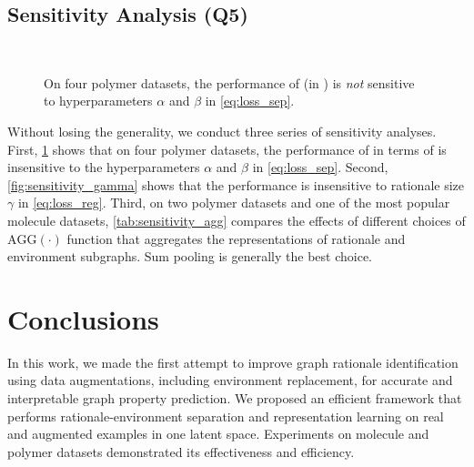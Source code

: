 \documentclass[sigconf]{acmart}
\begin{document}
\subsection{Sensitivity Analysis (Q5)}\label{sec:q5_sensitivity}
\begin{figure}[t]
    \centering
    \vspace{-0.15in}
    \hfill
    \\ \vspace{-0.15in}
    \hfill
    \vspace{-0.15in}
    \caption{On four polymer datasets, the performance of \method (in \regreRSquare) is \emph{not} sensitive to hyperparameters $\alpha$ and $\beta$ in \cref{eq:loss_sep}.}
    \label{fig:loss_sensitivity}
    \vspace{-0.2in}
\end{figure}

Without losing the generality, we conduct three series of sensitivity analyses. First, \cref{fig:loss_sensitivity} shows that on four polymer datasets, the performance of \method in terms of \regreRSquare is insensitive to the hyperparameters $\alpha$ and $\beta$ in \cref{eq:loss_sep}.
Second, \cref{fig:sensitivity_gamma} shows that the performance is insensitive to rationale size $\gamma$ in \cref{eq:loss_reg}.
Third, on two polymer datasets and one of the most popular molecule datasets, \cref{tab:sensitivity_agg} compares the effects of different choices of $\text{AGG}(\cdot)$ function that aggregates the representations of rationale and environment subgraphs. Sum pooling is generally the best choice. 
\section{Conclusions}
\label{sec:conclusion}
In this work, we made the first attempt to improve graph rationale identification using data augmentations, including environment replacement, for accurate and interpretable graph property prediction. We proposed an efficient framework that performs rationale-environment separation and representation learning on real and augmented examples in one latent space. Experiments on molecule and polymer datasets demonstrated its effectiveness and efficiency.
 
\end{document}
